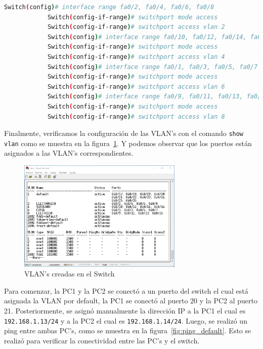         \begin{lstlisting}[language=bash, caption={Asignación de puertos a las VLAN's en el Switch},label={lst:asignacionPuertos}]
            Switch(config)# interface range fa0/2, fa0/4, fa0/6, fa0/8
            Switch(config-if-range)# switchport mode access
            Switch(config-if-range)# switchport access vlan 2
            Switch(config)# interface range fa0/10, fa0/12, fa0/14, fa0/16
            Switch(config-if-range)# switchport mode access
            Switch(config-if-range)# switchport access vlan 4
            Switch(config)# interface range fa0/1, fa0/3, fa0/5, fa0/7
            Switch(config-if-range)# switchport mode access
            Switch(config-if-range)# switchport access vlan 6
            Switch(config)# interface range fa0/9, fa0/11, fa0/13, fa0/15
            Switch(config-if-range)# switchport mode access
            Switch(config-if-range)# switchport access vlan 8
        \end{lstlisting}

        Finalmente, verificamos la configuración de las VLAN's con el comando \texttt{show vlan} como se muestra en la figura~\ref{fig:vlansSwitch}. Y podemos observar que los puertos están asignados a las VLAN's correspondientes.

        \begin{figure}[H]
            \centering
            \includegraphics[width=0.7\textwidth]{img/vlansSwitch.png}
            \caption{VLAN's creadas en el Switch}
            \label{fig:vlansSwitch}
        \end{figure}

        Para comenzar, la PC1 y la PC2 se conectó a un puerto del switch el cual está asignada la VLAN por default, la PC1 se conectó al puerto 20 y la PC2 al puerto 21. Posteriormente, se asignó manualmente la dirección IP  a la PC1 el cual es \texttt{192.168.1.13/24} y a la PC2 el cual es \texttt{192.168.1.14/24}. Luego, se realizó un ping entre ambas PC's, como se muestra en la figura~\ref{fig:ping_default}. Esto se realizó para verificar la conectividad entre las PC's y el switch.


